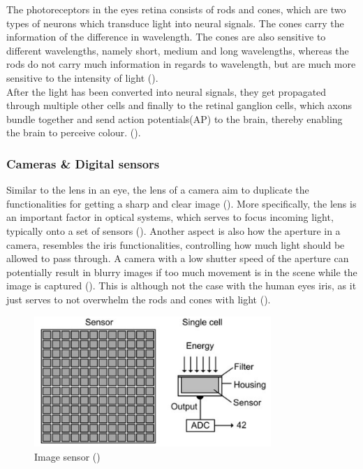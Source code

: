 \documentclass{article}
\newcommand{\goodcite}[1]{ {(\cite{#1})}}
\begin{document}
The photoreceptors in the eyes retina consists of rods and cones, which are two types of neurons which transduce light into neural signals. The cones carry the information of the difference in wavelength. The cones are also sensitive to different wavelengths, namely short, medium and long wavelengths, whereas the rods do not carry much information in regards to wavelength, but are much more sensitive to the intensity of light\goodcite{hsp}.\\After the light has been converted into neural signals, they get propagated through multiple other cells and finally to the retinal ganglion cells, which axons bundle together and send action potentials(AP) to the brain, thereby enabling the brain to perceive colour.\goodcite{hsp}.\\

\subsubsection{Cameras \& Digital sensors}
Similar to the lens in an eye, the lens of a camera aim to duplicate the functionalities for getting a sharp and clear image\goodcite{IP}. More specifically, the lens is an important factor in optical systems, which serves to focus incoming light, typically onto a set of sensors\goodcite{IP}. Another aspect is also how the aperture in a camera, resembles the iris functionalities, controlling how much light should be allowed to pass through. A camera with a low shutter speed of the aperture can potentially result in blurry images if too much movement is in the scene while the image is captured\goodcite{IP}. This is although not the case with the human eyes iris, as it just serves to not overwhelm the rods and cones with light\goodcite{hsp}.

\begin{figure}[H]
    \centering
    \includegraphics[width=0.8\textwidth]{img/sensor.png}
    \caption{Image sensor\goodcite{IP}}
    \label{fig:Image_sensor}
\end{figure}
\end{document}
